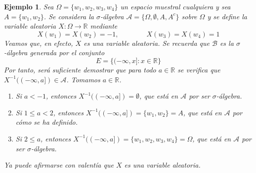 \documentclass[11pt]{report}
\theoremstyle{mytheorem}
\theoremstyle{mydefinition}
\theoremstyle{myexample}
\newtheorem*{example}{Ejemplo}
\newcommand{\R}{\mathbb R}
\begin{document}
\begin{example}
Sea $\Omega = \{w_1,w_2,w_3,w_4\}$ un espacio muestral cualquiera y sea $A = \{w_1,w_2\}$. Se considera la $\sigma$-álgebra $\mathcal{A} = \{\Omega, \emptyset, A, A^c\}$ sobre $\Omega$ y se define la variable aleatoria $X \colon \Omega \to \R$ mediante
\[X(w_1) = X(w_2) = -1, \qquad \qquad X(w_3) = X(w_4) = 1\]
Veamos que, en efecto, $X$ es una variable aleatoria. Se recuerda que $\mathcal{B}$ es la $\sigma$-álgebra generada por el conjunto 
\[E = \{(-\infty,x] \colon x \in \R\}\]
Por tanto, será suficiente demostrar que para todo $a \in \R$ se verifica que $X^{-1}((-\infty,a]) \in \mathcal{A}$. Tomamos $a \in \R$.
\begin{enumerate}
    \item Si $a < -1$, entonces $X^{-1}((-\infty,a]) = \emptyset$, que está en $\mathcal{A}$ por ser $\sigma$-álgebra.
    \item Si $1 \leq a < 2$, entonces $X^{-1}((-\infty,a]) = \{w_1,w_2\} = A$, que está en $\mathcal{A}$ por cómo se ha definido.
    \item Si $2 \leq a$, entonces $X^{-1}((-\infty,a]) = \{w_1,w_2,w_3,w_4\} = \Omega$, que está en $\mathcal{A}$ por ser $\sigma$-álgebra.
\end{enumerate}
Ya puede afirmarse con valentía que $X$ es una variable aleatoria.
\end{example}
\end{document}
